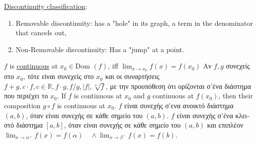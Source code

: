 \documentclass[12pt]{article}
\def\Dom{\text{Dom\ }} %
\begin{document}
\begin{flushleft}
	\textbullet \quad \uline{Discontinuity classification}:  
	\begin{enumerate}
	\item Removable discontinuity: has a "hole" in its graph, a term in the denominator that cancels out, 
	\item Non-Removable discontinuity: Has a "jump" at a point.
	\end{enumerate}
	\textbullet \quad $f$ is \uline{continuous} at $x_0 \in \Dom(f)$, iff $\displaystyle \lim_{x\to x_0} f(x) = f(x_0)$ \linebreak 
	\textbullet \quad \textgreek{Αν} $f,g$ \textgreek{συνεχείς στο} $x_0$, \textgreek{τότε είναι συνεχείς στο} $x_0$ \textgreek{και οι συναρτήσεις} $\displaystyle f+g, c\cdot f, c\in \mathbb{R}, f\cdot g, f/g, |f|, \sqrt[\nu]{f}$, \textgreek{με την προυπόθεση ότι ορίζονται σ'ένα διάστημα που περιέχει το} $x_0$. \linebreak 
	\textbullet \quad If $f$ is continuous at $x_0$ and $g$ continuous at $f(x_0)$, then their composition $g\circ f$ is continuous at $x_0$. \linebreak 
	\textbullet \quad $f$ \textgreek{είναι συνεχής σ'ενα ανοικτό διάστημα} $(a,b)$, \textgreek{όταν είναι συνεχής σε κάθε σημείο του} $(a,b)$. \linebreak 
	\textbullet \quad $f$ \textgreek{είναι συνεχής σ'ένα κλειστό διάστημα} $[a,b]$, \textgreek{όταν είναι συνεχής σε κάθε σημείο του} $(a,b)$ \textgreek{και επιπλέον} $\displaystyle \lim_{x\to \alpha^+} f(x) = f(\alpha) \quad \land \lim_{x\to \beta^-} f(x) = f(b)$. \linebreak 
	

\end{flushleft}
\end{document}
